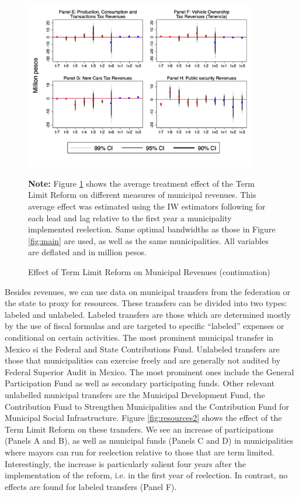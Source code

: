 \documentclass[12pt]{amsart}
\numberwithin{equation}{section}
\theoremstyle{definition}
\theoremstyle{definition}
\theoremstyle{definition}
\begin{document}
\begin{figure}[h]   
\centering
 \caption{Effect of Term Limit Reform on Municipal Revenues (continuation)}
 \label{fig:revenues2}
\includegraphics[width=0.9\textwidth]{Figures_incumbency/revenues_allyears2.png}
       \captionsetup{justification=centering}
         
 \textbf{Note:} Figure \ref{fig:revenues2} shows the average treatment effect of the Term Limit Reform on different measures of municipal revenues. This average effect was estimated using the IW estimators following \citet{abraham_sun_2020} for each lead and lag relative to the first year a municipality implemented reelection. Same optimal bandwidths as those in Figure \ref{fig:main} are used, as well as the same municipalities. All variables are deflated and in million pesos.  
          
\end{figure}  

 Besides revenues, we can use data on municipal transfers from the federation or the state to proxy for resources. These transfers can be divided into two types: labeled and unlabeled. Labeled transfers are those which are determined mostly by the use of fiscal formulas and are targeted to specific ``labeled'' expenses or conditional on certain activities. The most prominent municipal transfer in Mexico si the Federal and State Contributions Fund. Unlabeled transfers are those that municipalities can exercise freely and are generally not audited by Federal Superior Audit in Mexico. The most prominent ones include the General Participation Fund as well as secondary participating funds. Other relevant unlabelled municipal transfers are the Municipal Development Fund, the Contribution Fund to Strengthen Municipalities and the Contribution Fund for Municipal Social Infrastructure. Figure \ref{fig:resources2} shows the effect of the Term Limit Reform on these transfers. We see an increase of participations (Panels A and B), as well as municipal funds (Panels C and D) in municipalities where mayors can run for reelection relative to those that are term limited. Interestingly, the increase is particularly salient four years after the implementation of the reform, i.e. in the first year of reelection. In contrast, no effects are found for labeled transfers (Panel F). 
   
\end{document}
